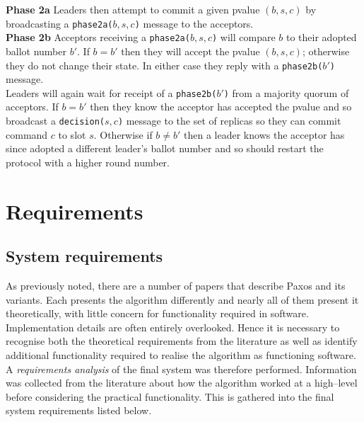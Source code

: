 \textbf{Phase 2a} Leaders then attempt to commit a given pvalue $\left( b, s, c \right)$ by broadcasting a \texttt{phase2a($b,s,c$)} message to the acceptors. \\

\textbf{Phase 2b} Acceptors receiving a \texttt{phase2a($b,s,c$)} will compare $b$ to their adopted ballot number $b'$. If $b = b'$ then they will accept the pvalue $(b,s,c)$; otherwise they do not change their state. In either case they reply with a  \texttt{phase2b($b'$)} message. \\

Leaders will again wait for receipt of a \texttt{phase2b($b'$)} from a majority quorum of acceptors. If $b = b'$ then they know the acceptor has accepted the pvalue and so broadcast a \texttt{decision($s,c$)} message to the set of replicas so they can commit command $c$ to slot $s$. Otherwise if $b \neq b'$ then a leader knows the acceptor has since adopted a different leader's ballot number and so should restart the protocol with a higher round number.



\section{Requirements}

\subsection{System requirements}

As previously noted, there are a number of papers that describe Paxos and its variants. Each presents the algorithm differently and nearly all of them present it theoretically, with little concern for functionality required in software. Implementation details are often entirely overlooked. Hence it is necessary to recognise both the theoretical requirements from the literature as well as identify additional functionality required to realise the algorithm as functioning software. \\

A \emph{requirements analysis} of the final system was therefore performed. Information was collected from the literature about how the algorithm worked at a high--level before considering the practical functionality. This is gathered into the final system requirements listed below. \\

